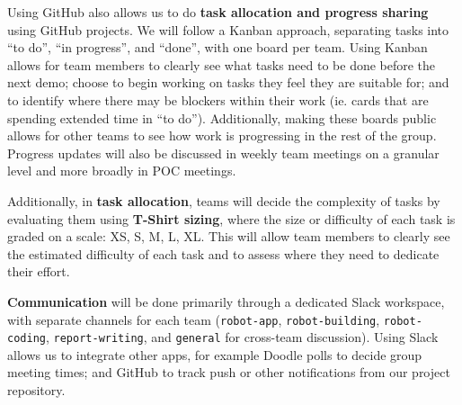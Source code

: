 \documentclass{article}
\begin{document}
Using GitHub also allows us to do {\bf task allocation and progress sharing} using GitHub projects. We will follow a Kanban approach, separating tasks into ``to do'', ``in progress'', and ``done'', with one board per team. Using Kanban allows for team members to clearly see what tasks need to be done before the next demo; choose to begin working on tasks they feel they are suitable for; and to identify where there may be blockers within their work (ie. cards that are spending extended time in ``to do''). Additionally, making these boards public allows for other teams to see how work is progressing in the rest of the group. Progress updates will also be discussed in weekly team meetings on a granular level and more broadly in POC meetings.

Additionally, in {\bf task allocation}, teams will decide the complexity of tasks by evaluating them using {\bf T-Shirt sizing}, where the size or difficulty of each task is graded on a scale: XS, S, M, L, XL. This will allow team members to clearly see the estimated difficulty of each task and to assess where they need to dedicate their effort. 

{\bf Communication} will be done primarily through a dedicated Slack workspace, with separate channels for each team ({\tt robot-app}, {\tt robot-building}, {\tt robot-coding}, {\tt report-writing}, and {\tt general} for cross-team discussion). Using Slack allows us to integrate other apps, for example Doodle polls to decide group meeting times; and GitHub to track push or other notifications from our project repository. 




\end{document}
